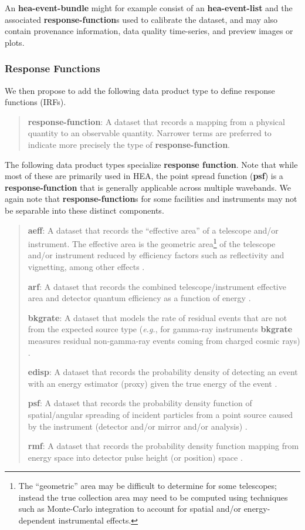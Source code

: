 \documentclass[11pt,a4paper]{ivoa}
\begin{document}
An {\bf hea-event-bundle} might for example consist of an {\bf hea-event-list} and the associated {\bf response-function}s used to calibrate the dataset, and may also contain provenance information, data quality time-series, and preview images or plots.


\subsubsection{Response Functions}
\label{sec:responsefct}

We then propose to add the following data product type to define response functions (\glspl{IRF}).

\begin{quote}
 {\bf response-function}: A dataset that records a mapping from a physical quantity to an observable quantity.  Narrower terms are preferred to indicate more precisely the type of {\bf response-function}.
 \end{quote}

The following data product types specialize {\bf response function}.  Note that while most of these are primarily used in \gls{HEA}, the point spread function ({\bf psf}) is a {\bf response-function} that is generally applicable across multiple wavebands.  We again note that {\bf response-function}s for some facilities and instruments may not be separable into these distinct components.

\begin{quote}
{\bf aeff}: A dataset that records the ``effective area'' of a telescope and/or instrument.  The effective area is the geometric area\footnote{The ``geometric'' area may be difficult to determine for some telescopes; instead the true collection area may need to be computed using techniques such as Monte-Carlo integration to account for spatial and/or energy-dependent instrumental effects.} of the telescope and/or instrument reduced by efficiency factors such as reflectivity and vignetting, among other effects \citep{deil_2022_7304668}.

{\bf arf}: A dataset that records the combined telescope/instrument effective area and detector quantum efficiency as a function of energy \citep{ogip_spectrum_1998}.

{\bf bkgrate}: A dataset that models the rate of residual events that are not from the expected source type ({\em e.g.\/}, for gamma-ray instruments {\bf bkgrate} measures residual non-gamma-ray events coming from charged cosmic rays)  \citep{deil_2022_7304668}.

{\bf edisp}: A dataset that records the probability density of detecting an event with an energy estimator (proxy) given the true energy of the event \citep{deil_2022_7304668}.

{\bf psf}: A dataset that records the probability density function of spatial/angular spreading of incident particles from a point source caused by the instrument (detector and/or mirror and/or analysis) \citep{deil_2022_7304668, ogip_psf_2011}.

{\bf rmf}: A dataset that records the probability density function mapping from energy space into detector pulse height (or position) space \citep{ogip_spectrum_1998}.
\end{quote}
\end{document}
